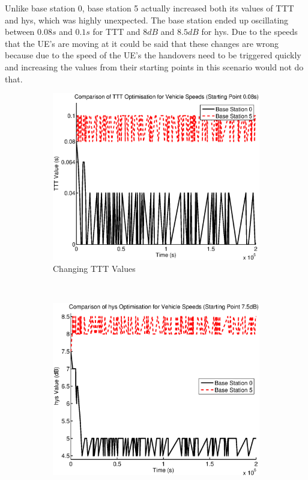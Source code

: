 Unlike base station 0, base station 5 actually increased both its values of TTT and hys, which was highly unexpected. The base station ended up oscillating between $0.08 s$ and $0.1 s$ for TTT and $8 dB$ and $8.5 dB$ for hys. Due to the speeds that the UE’s are moving at it could be said that these changes are wrong because due to the speed of the UE’s the handovers need to be triggered quickly and increasing the values from their starting points in this scenario would not do that.
\begin{figure}[H]
        \centering
        \begin{subfigure}[b]{0.49\textwidth}
                \includegraphics[width=\textwidth]{figures/vehicle_figures/highhys/long_ttt.eps}
                \caption{Changing TTT Values}
                \label{fig:veh_highhys_ttt}
        \end{subfigure}%
        ~ %
        \begin{subfigure}[b]{0.49\textwidth}
                \includegraphics[width=\textwidth]{figures/vehicle_figures/highhys/long_hys.eps}

\end{subfigure}
\end{figure}
